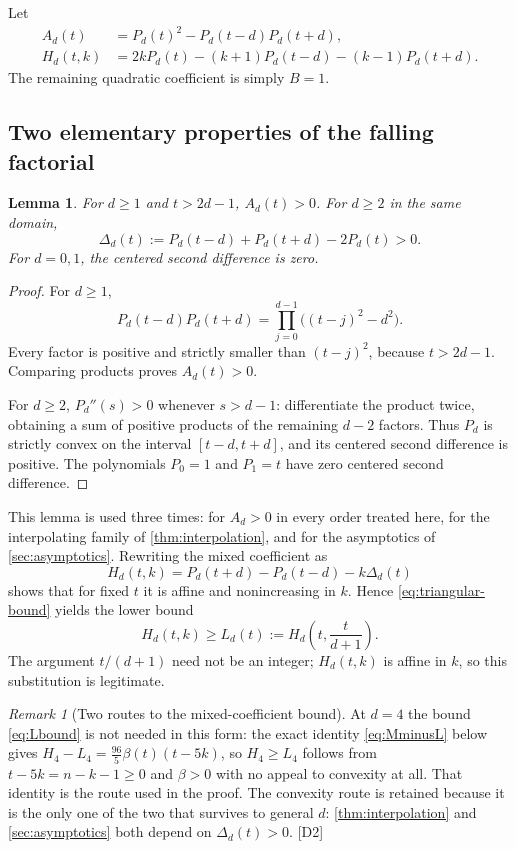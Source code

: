 \documentclass[11pt,a4paper]{article}
\numberwithin{equation}{section}
\newtheorem{lemma}[lemma]{Lemma}
\theoremstyle{definition}
\theoremstyle{remark}
\newtheorem{remark}[remark]{Remark}
\newcommand{\dup}[1]{{\small\textsf{\color{MutedInk}[#1]}}}
\begin{document}
Let
\begin{align}
 A_d(t)&=P_d(t)^2-P_d(t-d)P_d(t+d),\label{eq:Ad}\\
 H_d(t,k)&=2kP_d(t)-(k+1)P_d(t-d)-(k-1)P_d(t+d).
                                                       \label{eq:Hd}
\end{align}
The remaining quadratic coefficient is simply $B=1$.

\subsection{Two elementary properties of the falling factorial}

\begin{lemma}\label{lem:falling}
For $d\ge1$ and $t>2d-1$, $A_d(t)>0$. For $d\ge2$ in the same domain,
\[
 \Delta_d(t):=P_d(t-d)+P_d(t+d)-2P_d(t)>0.
\]
For $d=0,1$, the centered second difference is zero.
\end{lemma}
\begin{proof}
For $d\ge1$,
\[
 P_d(t-d)P_d(t+d)=\prod_{j=0}^{d-1}\bigl((t-j)^2-d^2\bigr).
\]
Every factor is positive and strictly smaller than $(t-j)^2$, because
$t>2d-1$. Comparing products proves $A_d(t)>0$.

For $d\ge2$, $P_d''(s)>0$ whenever $s>d-1$: differentiate the product
twice, obtaining a sum of positive products of the remaining $d-2$
factors. Thus $P_d$ is strictly convex on the interval $[t-d,t+d]$,
and its centered second difference is positive. The polynomials
$P_0=1$ and $P_1=t$ have zero centered second difference.
\end{proof}

This lemma is used three times: for $A_d>0$ in every order treated here,
for the interpolating family of \cref{thm:interpolation}, and for the
asymptotics of \cref{sec:asymptotics}. Rewriting the mixed coefficient as
\begin{equation}\label{eq:Hdecreasing}
 H_d(t,k)=P_d(t+d)-P_d(t-d)-k\Delta_d(t)
\end{equation}
shows that for fixed $t$ it is affine and nonincreasing in $k$. Hence
\eqref{eq:triangular-bound} yields the lower bound
\begin{equation}\label{eq:Lbound}
 H_d(t,k)\ge L_d(t):=H_d\!\left(t,\frac{t}{d+1}\right).
\end{equation}
The argument $t/(d+1)$ need not be an integer; $H_d(t,k)$ is affine in $k$,
so this substitution is legitimate.

\begin{remark}[Two routes to the mixed-coefficient bound]\label{rem:tworoutes}
At $d=4$ the bound \eqref{eq:Lbound} is not needed in this form: the exact
identity \eqref{eq:MminusL} below gives $H_4-L_4=\frac{96}{5}\beta(t)(t-5k)$,
so $H_4\ge L_4$ follows from $t-5k=n-k-1\ge0$ and $\beta>0$ with no appeal
to convexity at all. That identity is the route used in the proof. The
convexity route is retained because it is the only one of the two that
survives to general $d$: \cref{thm:interpolation} and
\cref{sec:asymptotics} both depend on $\Delta_d(t)>0$. \dup{D2}
\end{remark}
\end{document}
